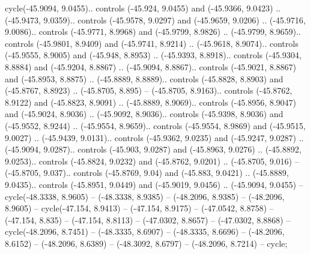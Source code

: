 \begin{scope}[shift={(2.5552, 9.9912)}]
\begin{scope}[shift={(48.1654, -14.8546)}]
cycle(-45.9094, 9.0455).. controls (-45.924, 9.0455) and (-45.9366, 9.0423) .. (-45.9473, 9.0359).. controls (-45.9578, 9.0297) and (-45.9659, 9.0206) .. (-45.9716, 9.0086).. controls (-45.9771, 8.9968) and (-45.9799, 8.9826) .. (-45.9799, 8.9659).. controls (-45.9801, 8.9409) and (-45.9741, 8.9214) .. (-45.9618, 8.9074).. controls (-45.9555, 8.9005) and (-45.948, 8.8953) .. (-45.9393, 8.8918).. controls (-45.9304, 8.8884) and (-45.9204, 8.8867) .. (-45.9094, 8.8867).. controls (-45.9021, 8.8867) and (-45.8953, 8.8875) .. (-45.8889, 8.8889).. controls (-45.8828, 8.8903) and (-45.8767, 8.8923) .. (-45.8705, 8.895) -- (-45.8705, 8.9163).. controls (-45.8762, 8.9122) and (-45.8823, 8.9091) .. (-45.8889, 8.9069).. controls (-45.8956, 8.9047) and (-45.9024, 8.9036) .. (-45.9092, 8.9036).. controls (-45.9398, 8.9036) and (-45.9552, 8.9244) .. (-45.9554, 8.9659).. controls (-45.9554, 8.9869) and (-45.9515, 9.0027) .. (-45.9439, 9.0131).. controls (-45.9362, 9.0235) and (-45.9247, 9.0287) .. (-45.9094, 9.0287).. controls (-45.903, 9.0287) and (-45.8963, 9.0276) .. (-45.8892, 9.0253).. controls (-45.8824, 9.0232) and (-45.8762, 9.0201) .. (-45.8705, 9.016) -- (-45.8705, 9.037).. controls (-45.8769, 9.04) and (-45.883, 9.0421) .. (-45.8889, 9.0435).. controls (-45.8951, 9.0449) and (-45.9019, 9.0456) .. (-45.9094, 9.0455) -- cycle(-48.3338, 8.9605) -- (-48.3338, 8.9385) -- (-48.2096, 8.9385) -- (-48.2096, 8.9605) -- cycle(-47.154, 8.9413) -- (-47.154, 8.9175) -- (-47.0542, 8.8758) -- (-47.154, 8.835) -- (-47.154, 8.8113) -- (-47.0302, 8.8657) -- (-47.0302, 8.8868) -- cycle(-48.2096, 8.7451) -- (-48.3335, 8.6907) -- (-48.3335, 8.6696) -- (-48.2096, 8.6152) -- (-48.2096, 8.6389) -- (-48.3092, 8.6797) -- (-48.2096, 8.7214) -- cycle;



    \end{scope}
  \end{scope}
